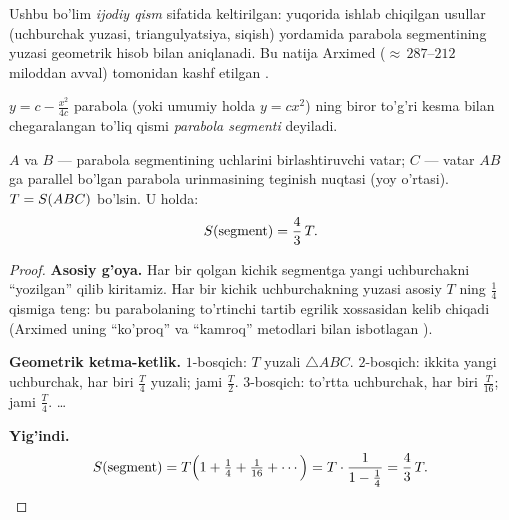 Ushbu bo'lim \emph{ijodiy qism} sifatida keltirilgan:
yuqorida ishlab chiqilgan usullar (uchburchak yuzasi, triangulyatsiya, siqish)
yordamida parabola segmentining yuzasi geometrik hisob bilan aniqlanadi.
Bu natija Arximed ($\approx\,287$--$212$ miloddan avval) tomonidan kashf etilgan
\cite{Archimedes_Heath1897}.

\begin{tarif}
$y = c - \tfrac{x^2}{4c}$ parabola (yoki umumiy holda $y=cx^2$)
ning biror to'g'ri kesma bilan chegaralangan to'liq qismi
\emph{parabola segmenti} deyiladi.
\end{tarif}

\begin{teorema}[Arximed]
\label{thm:archimedes}
$A$ va $B$ — parabola segmentining uchlarini birlashtiruvchi vatar; $C$ ---
vatar $AB$ ga parallel bo'lgan parabola urinmasining teginish nuqtasi (yoy o'rtasi).
$T = S\!\left(ABC\right)$ bo'lsin. U holda:
\[
  S\!\left(\text{segment}\right) = \frac{4}{3}\,T.
\]
\end{teorema}
\begin{proof}
\textbf{Asosiy g'oya.}
Har bir qolgan kichik segmentga yangi uchburchakni ``yozilgan'' qilib kiritamiz.
Har bir kichik uchburchakning yuzasi asosiy $T$ ning $\tfrac{1}{4}$ qismiga teng:
bu parabolaning to'rtinchi tartib egrilik xossasidan kelib chiqadi (Arximed uning
``ko'proq'' va ``kamroq'' metodlari bilan isbotlagan \cite{Archimedes_Heath1897}).

\textbf{Geometrik ketma-ketlik.}
$1$-bosqich: $T$ yuzali $\triangle ABC$.
$2$-bosqich: ikkita yangi uchburchak, har biri $\tfrac{T}{4}$ yuzali; jami $\tfrac{T}{2}$.
$3$-bosqich: to'rtta uchburchak, har biri $\tfrac{T}{16}$; jami $\tfrac{T}{4}$. \ldots

\textbf{Yig'indi.}
\[
  S\!\left(\text{segment}\right)
  = T\Bigl(1 + \tfrac{1}{4} + \tfrac{1}{16} + \cdots\Bigr)
  = T \cdot \frac{1}{1-\tfrac{1}{4}}
  = \frac{4}{3}\,T. \qedhere
\]
\end{proof}

